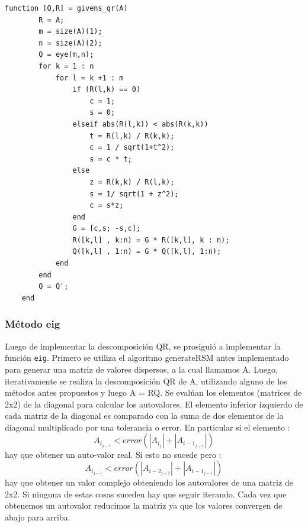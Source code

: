 \documentclass[a4paper,10pt,spanish]{article}
\begin{document}
\begin{lstlisting}[caption = Implementación de la descomposición QR con GS]
	function [Q,R] = givens_qr(A)
		R = A;
		m = size(A)(1);
		n = size(A)(2);
		Q = eye(m,n);
		for k = 1 : n
			for l = k +1 : m
				if (R(l,k) == 0)
					c = 1;
					s = 0;
				elseif abs(R(l,k)) < abs(R(k,k))
					t = R(l,k) / R(k,k);
					c = 1 / sqrt(1+t^2);
					s = c * t;
				else
					z = R(k,k) / R(l,k);
					s = 1/ sqrt(1 + z^2);
					c = s*z;
				end
				G = [c,s; -s,c];
				R([k,l] , k:n) = G * R([k,l], k : n);
				Q([k,l] , 1:n) = G * Q([k,l], 1:n);
			end
		end
		Q = Q';
	end
\end{lstlisting}




\subsubsection{Método eig}

Luego de implementar la descomposición QR, se prosiguió a implementar la función \texttt{eig}. Primero se utiliza el algoritmo generateRSM antes implementado para generar una matriz de valores dispersos, a la cual llamamos A. Luego, iterativamente se realiza la descomposición QR de A, utilizando alguno de los métodos antes propuestos y luego A = RQ. Se evalúan los elementos (matrices de 2x2) de la diagonal para calcular los autovalores. El elemento inferior izquierdo de cada matriz de la diagonal es comparado con la suma de dos elementos de la diagonal multiplicado por una tolerancia o error. En particular si el elemento : \[A_i_{j-1} < error ( | A_i_j | + | A_{i-1}_{j-1} |) \] hay que obtener un auto-valor real. Si esto no sucede pero : \[A_i_{j-1} < error ( | A_{i-2}_{j-2} | + | A_{i-1}_{j-1} |) \] hay que obtener un valor complejo obteniendo los autovalores de una matriz de 2x2. Si ninguna de estas cosas suceden hay que seguir iterando. Cada vez que obtenemos un autovalor reducimos la matriz ya que los valores convergen de abajo para arriba.
\end{document}
